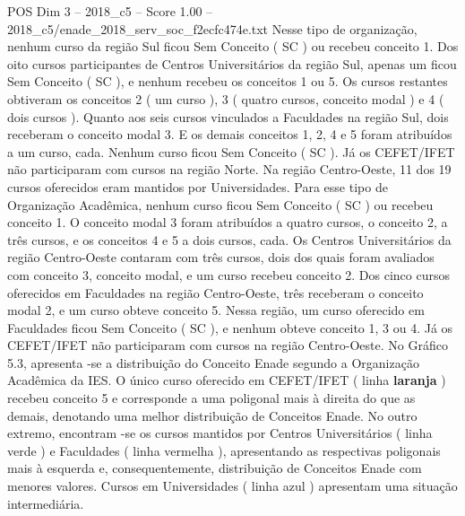 \begin{textsample}{POS Dim 3 – 2018\_c5 – Score 1.00 – 2018\_c5/enade\_2018\_serv\_soc\_f2ecfc474e.txt}
Nesse tipo de organização, nenhum curso da região Sul ficou Sem Conceito ( SC ) ou recebeu conceito 1.
Dos oito cursos participantes de Centros Universitários da região Sul, apenas um ficou Sem Conceito ( SC ), e nenhum recebeu os conceitos 1 ou 5.
Os cursos restantes obtiveram os conceitos 2 ( um curso ), 3 ( quatro cursos, conceito modal ) e 4 ( dois cursos ).
Quanto aos seis cursos vinculados a Faculdades na região Sul, dois receberam o conceito modal 3.
E os demais conceitos 1, 2, 4 e 5 foram atribuídos a um curso, cada.
Nenhum curso ficou Sem Conceito ( SC ).
Já os CEFET/IFET não participaram com cursos na região Norte.
Na região Centro-Oeste, 11 dos 19 cursos oferecidos eram mantidos por Universidades.
Para esse tipo de Organização Acadêmica, nenhum curso ficou Sem Conceito ( SC ) ou recebeu conceito 1.
O conceito modal 3 foram atribuídos a quatro cursos, o conceito 2, a três cursos, e os conceitos 4 e 5 a dois cursos, cada.
Os Centros Universitários da região Centro-Oeste contaram com três cursos, dois dos quais foram avaliados com conceito 3, conceito modal, e um curso recebeu conceito 2.
Dos cinco cursos oferecidos em Faculdades na região Centro-Oeste, três receberam o conceito modal 2, e um curso obteve conceito 5.
Nessa região, um curso oferecido em Faculdades ficou Sem Conceito ( SC ), e nenhum obteve conceito 1, 3 ou 4.
Já os CEFET/IFET não participaram com cursos na região Centro-Oeste.
No Gráfico 5.3, apresenta -se a distribuição do Conceito Enade segundo a Organização Acadêmica da IES.
O único curso oferecido em CEFET/IFET ( linha \textbf{laranja} ) recebeu conceito 5 e corresponde a uma poligonal mais à direita do que as demais, denotando uma melhor distribuição de Conceitos Enade.
No outro extremo, encontram -se os cursos mantidos por Centros Universitários ( linha verde ) e Faculdades ( linha vermelha ), apresentando as respectivas poligonais mais à esquerda e, consequentemente, distribuição de Conceitos Enade com menores valores.
Cursos em Universidades ( linha azul ) apresentam uma situação intermediária.

\end{textsample}
